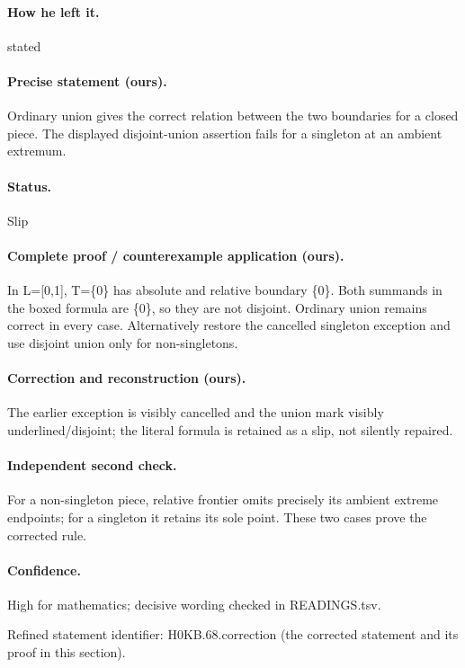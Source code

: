 \paragraph{How he left it.} stated

\paragraph{Precise statement (ours).} Ordinary union gives the correct relation between the two boundaries for a closed piece. The displayed disjoint-union assertion fails for a singleton at an ambient extremum.

\paragraph{Status.} Slip

\paragraph{Complete proof / counterexample application (ours).} In L=[0,1], T=\{0\} has absolute and relative boundary \{0\}. Both summands in the boxed formula are \{0\}, so they are not disjoint. Ordinary union remains correct in every case. Alternatively restore the cancelled singleton exception and use disjoint union only for non-singletons.

\paragraph{Correction and reconstruction (ours).} The earlier exception is visibly cancelled and the union mark visibly underlined/disjoint; the literal formula is retained as a slip, not silently repaired.

\paragraph{Independent second check.} For a non-singleton piece, relative frontier omits precisely its ambient extreme endpoints; for a singleton it retains its sole point. These two cases prove the corrected rule.

\paragraph{Confidence.} High for mathematics; decisive wording checked in READINGS.tsv.

\noindent Refined statement identifier: H0KB.68.correction (the corrected statement and its proof in this section).

